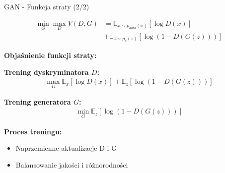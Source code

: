 \documentclass{beamer}
\begin{document}
\begin{frame}{GAN - Funkcja straty (2/2)}
    \begin{center}
        \begin{tcolorbox}[
                colback=yellow!10!white,
                colframe=black!60,
                boxrule=0.5pt,
                arc=3mm,
                boxsep=2pt,
                width=0.8\textwidth %
            ]
            \begin{align*}
                \min_G \max_D V(D,G) & = \mathbb{E}_{x \sim p_{data}(x)}[\log D(x)]    \\
                                     & + \mathbb{E}_{z \sim p_z(z)}[\log(1 - D(G(z)))]
            \end{align*}
        \end{tcolorbox}
    \end{center}

    \vspace{1em} %

    \textbf{Objaśnienie funkcji straty:}
    \medskip %

    \textbf{Trening dyskryminatora $D$:}
    \begin{align*}
        \max_D \mathbb{E}_{x}[\log D(x)] + \mathbb{E}_{z}[\log(1 - D(G(z)))]
    \end{align*}

    \textbf{Trening generatora $G$:}
    \begin{align*}
        \min_G \mathbb{E}_{z}[\log(1 - D(G(z)))]
    \end{align*}

    \vspace{0.5em} %
    \textbf{Proces treningu:}
    \begin{itemize}
        \item Naprzemienne aktualizacje D i G
        \item Balansowanie jakości i różnorodności
    \end{itemize}
\end{frame}
\end{document}
